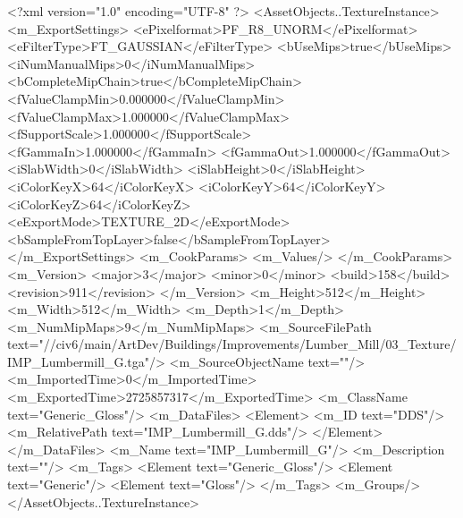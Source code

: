 <?xml version="1.0" encoding="UTF-8" ?>
<AssetObjects..TextureInstance>
	<m_ExportSettings>
		<ePixelformat>PF_R8_UNORM</ePixelformat>
		<eFilterType>FT_GAUSSIAN</eFilterType>
		<bUseMips>true</bUseMips>
		<iNumManualMips>0</iNumManualMips>
		<bCompleteMipChain>true</bCompleteMipChain>
		<fValueClampMin>0.000000</fValueClampMin>
		<fValueClampMax>1.000000</fValueClampMax>
		<fSupportScale>1.000000</fSupportScale>
		<fGammaIn>1.000000</fGammaIn>
		<fGammaOut>1.000000</fGammaOut>
		<iSlabWidth>0</iSlabWidth>
		<iSlabHeight>0</iSlabHeight>
		<iColorKeyX>64</iColorKeyX>
		<iColorKeyY>64</iColorKeyY>
		<iColorKeyZ>64</iColorKeyZ>
		<eExportMode>TEXTURE_2D</eExportMode>
		<bSampleFromTopLayer>false</bSampleFromTopLayer>
	</m_ExportSettings>
	<m_CookParams>
		<m_Values/>
	</m_CookParams>
	<m_Version>
		<major>3</major>
		<minor>0</minor>
		<build>158</build>
		<revision>911</revision>
	</m_Version>
	<m_Height>512</m_Height>
	<m_Width>512</m_Width>
	<m_Depth>1</m_Depth>
	<m_NumMipMaps>9</m_NumMipMaps>
	<m_SourceFilePath text="//civ6/main/ArtDev/Buildings/Improvements/Lumber_Mill/03_Texture/IMP_Lumbermill_G.tga"/>
	<m_SourceObjectName text=""/>
	<m_ImportedTime>0</m_ImportedTime>
	<m_ExportedTime>2725857317</m_ExportedTime>
	<m_ClassName text="Generic_Gloss"/>
	<m_DataFiles>
		<Element>
			<m_ID text="DDS"/>
			<m_RelativePath text="IMP_Lumbermill_G.dds"/>
		</Element>
	</m_DataFiles>
	<m_Name text="IMP_Lumbermill_G"/>
	<m_Description text=""/>
	<m_Tags>
		<Element text="Generic_Gloss"/>
		<Element text="Generic"/>
		<Element text="Gloss"/>
	</m_Tags>
	<m_Groups/>
</AssetObjects..TextureInstance>

